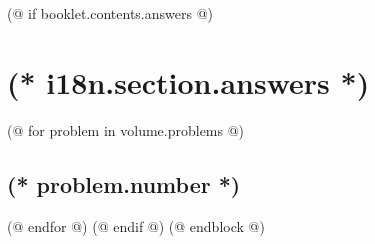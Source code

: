     (@ if booklet.contents.answers @)
        \section{(* i18n.section.answers *)}
        \pagestyle{answers}
        (@ for problem in volume.problems @)%
            \setcounter{problem}{(* problem.number *)}%
            \subsection{\texorpdfstring{(* problem.number *)}{(* problem.number *). (* problem.id *)}}%
            \label{ssc:(* problem.id*)-answer}%
        (@ endfor @)
    (@ endif @)
(@ endblock @)
